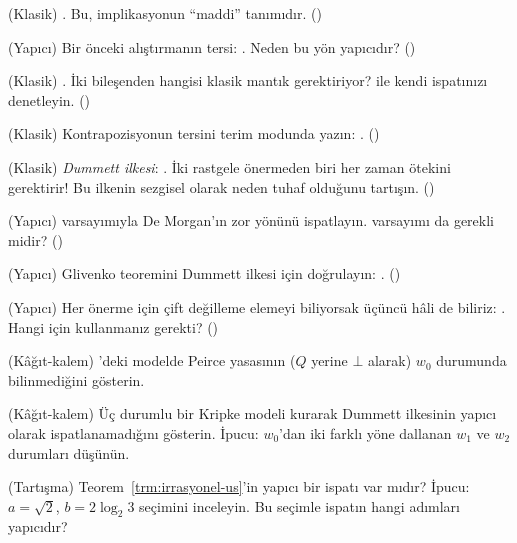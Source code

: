 \begin{alistirmalar}
 (Klasik) . Bu, implikasyonun
``maddi'' tanımıdır. ()

 (Yapıcı) Bir önceki alıştırmanın tersi:
. Neden bu yön yapıcıdır? ()

 (Klasik) . İki bileşenden hangisi
klasik mantık gerektiriyor?  ile kendi
ispatınızı denetleyin. ()

 (Klasik) Kontrapozisyonun tersini terim modunda
yazın: . ()

 (Klasik) \emph{Dummett ilkesi}: .
İki rastgele önermeden biri her zaman ötekini gerektirir! Bu ilkenin
sezgisel olarak neden tuhaf olduğunu tartışın. ()

 (Yapıcı) \lc{[Decidable P]} varsayımıyla De Morgan'ın zor
yönünü ispatlayın.  varsayımı da gerekli midir?
()

 (Yapıcı) Glivenko teoremini Dummett ilkesi için
doğrulayın: . ()

\label{alis:dne-em} (Yapıcı) Her önerme için çift
değilleme elemeyi biliyorsak üçüncü hâli de biliriz:
. Hangi  için kullanmanız
gerekti? ()

 (Kâğıt-kalem) 'deki modelde Peirce
yasasının ($Q$ yerine $\bot$ alarak) $w_0$ durumunda bilinmediğini
gösterin.

 (Kâğıt-kalem) Üç durumlu bir Kripke modeli kurarak
Dummett ilkesinin yapıcı olarak ispatlanamadığını gösterin. İpucu:
$w_0$'dan iki farklı yöne dallanan $w_1$ ve $w_2$ durumları düşünün.

 (Tartışma) Teorem~\ref{trm:irrasyonel-us}'in yapıcı bir ispatı
var mıdır? İpucu: $a = \sqrt{2}$, $b = 2\log_2 3$ seçimini inceleyin.
Bu seçimle ispatın hangi adımları yapıcıdır?
\end{alistirmalar}
